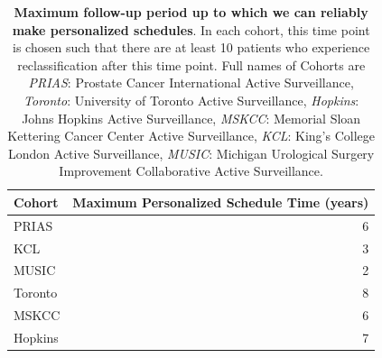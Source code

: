 \begin{table}[!htb]
\small\sf\centering
\caption{\textbf{Maximum follow-up period up to which we can reliably make personalized schedules}. In each cohort, this time point is chosen such that there are at least 10 patients who experience reclassification after this time point. Full names of Cohorts are \textit{PRIAS}: Prostate Cancer International Active Surveillance, \textit{Toronto}: University of Toronto Active Surveillance, \textit{Hopkins}: Johns Hopkins Active Surveillance, \textit{MSKCC}: Memorial Sloan Kettering Cancer Center Active Surveillance, \textit{KCL}: King's College London Active Surveillance, \textit{MUSIC}: Michigan Urological Surgery Improvement Collaborative Active Surveillance.}
\label{tab:max_pred_time_repeat}
\begin{tabular}{l|r}
\hline
\hline
Cohort & Maximum Personalized Schedule Time (years)\\ 
\hline
PRIAS & 6\\
KCL & 3\\
MUSIC & 2\\
Toronto & 8\\
MSKCC & 6\\
Hopkins & 7\\
\hline
\end{tabular}	
\end{table}

